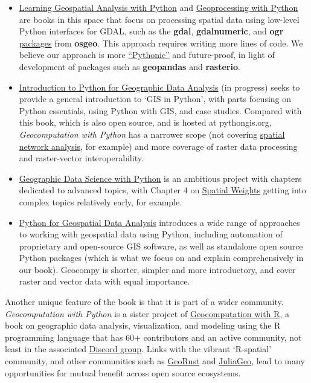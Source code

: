 \documentclass[
  letterpaper,
]{krantz}
\providecommand{\tightlist}{%
  \setlength{\itemsep}{0pt}\setlength{\parskip}{0pt}}\usepackage{longtable,booktabs,array}
\begin{document}
\begin{itemize}
\tightlist
\item
  \href{https://www.packtpub.com/product/learning-geospatial-analysis-with-python/9781783281138}{Learning
  Geospatial Analysis with Python} and
  \href{https://www.manning.com/books/geoprocessing-with-python}{Geoprocessing
  with Python} are books in this space that focus on processing spatial
  data using low-level Python interfaces for GDAL, such as the
  \textbf{gdal}, \textbf{gdalnumeric}, and \textbf{ogr}
  \href{https://gdal.org/api/python_bindings.html}{packages} from
  \textbf{osgeo}. This approach requires writing more lines of code. We
  believe our approach is more
  \href{https://rasterio.readthedocs.io/en/latest/intro.html\#philosophy}{``Pythonic''}
  and future-proof, in light of development of packages such as
  \textbf{geopandas} and \textbf{rasterio}.
\item
  \href{https://pythongis.org/}{Introduction to Python for Geographic
  Data Analysis} (in progress) seeks to provide a general introduction
  to `GIS in Python', with parts focusing on Python essentials, using
  Python with GIS, and case studies. Compared with this book, which is
  also open source, and is hosted at pythongis.org, \emph{Geocomputation
  with Python} has a narrower scope (not covering
  \href{https://pythongis.org/part3/chapter-11/index.html}{spatial
  network analysis}, for example) and more coverage of raster data
  processing and raster-vector interoperability.
\item
  \href{https://geographicdata.science/book/intro.html}{Geographic Data
  Science with Python} is an ambitious project with chapters dedicated
  to advanced topics, with Chapter 4 on
  \href{https://geographicdata.science/book/notebooks/04_spatial_weights.html}{Spatial
  Weights} getting into complex topics relatively early, for example.
\item
  \href{https://www.oreilly.com/library/view/python-for-geospatial/9781098104788/}{Python
  for Geospatial Data Analysis} introduces a wide range of approaches to
  working with geospatial data using Python, including automation of
  proprietary and open-source GIS software, as well as standalone open
  source Python packages (which is what we focus on and explain
  comprehensively in our book). Geocompy is shorter, simpler and more
  introductory, and cover raster and vector data with equal importance.
\end{itemize}

Another unique feature of the book is that it is part of a wider
community. \emph{Geocomputation with Python} is a sister project of
\href{https://r.geocompx.org/}{Geocomputation with R}, a book on
geographic data analysis, visualization, and modeling using the R
programming language that has 60+ contributors and an active community,
not least in the associated \href{https://discord.gg/PMztXYgNxp}{Discord
group}. Links with the vibrant `R-spatial' community, and other
communities such as \href{https://georust.org/}{GeoRust} and
\href{https://juliageo.org/}{JuliaGeo}, lead to many opportunities for
mutual benefit across open source ecosystems.
\end{document}
